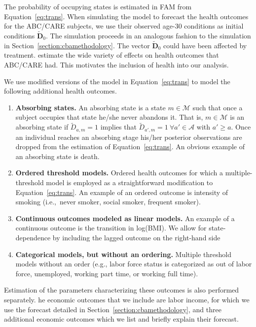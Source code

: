 The probability of occupying states is estimated in FAM from Equation~\eqref{eq:trans}. When simulating the model to forecast the health outcomes for the ABC/CARE subjects, we use their observed age-30 conditions as initial conditions  $\tilde{\bm{D}}_0$. The simulation proceeds in an analogous fashion to the simulation in Section~\ref{section:cbamethodology}. The vector $\tilde{\bm{D}}_0$ could have been affected by treatment. \citet{Campbell_Conti_etal_2014_EarlyChildhoodInvestments} estimate the wide variety of effects on health outcomes that ABC/CARE had. This motivates the inclusion of health into our analysis.

We use modified versions of the model in Equation~\eqref{eq:trans} to model the following additional health outcomes.

\begin{enumerate}
\item \textbf{Absorbing states.} An absorbing state is a state $m \in \mathcal{M}$ such that once a subject occupies that state he/she never abandons it. That is, $m \in \mathcal{M}$ is an absorbing state if $\tilde{D}_{a,m} = 1$ implies that $\tilde{D}_{a',m} = 1 \ \forall a' \in \mathcal{A}$ with $a' \geq a.$ Once an individual reaches an absorbing stage his/her posterior observations are dropped from the estimation of Equation~\eqref{eq:trans}. An obvious example of an absorbing state is death.
\item \textbf{Ordered threshold models.} Ordered health outcomes for which a multiple-threshold model is employed as a straightforward modification to Equation~\eqref{eq:trans}. An example of an ordered outcome is intensity of smoking (i.e.,\ never smoker, social smoker, frequent smoker).
\item \textbf{Continuous outcomes modeled as linear models.} An example of a continuous outcome is the
transition in log(BMI). We allow for state-dependence by including the lagged outcome on the right-hand side
\item \textbf{Categorical models, but without an ordering.} Multiple threshold models without an order (e.g., labor force status is categorized as out of labor force, unemployed, working part time, or working full time).
\end{enumerate}

Estimation of the parameters characterizing these outcomes is also performed separately. he economic outcomes that we include are labor income, for which we use the forecast detailed in Section~\ref{section:cbamethodology}, and three additional economic outcomes which we list and briefly explain their forecast. 

